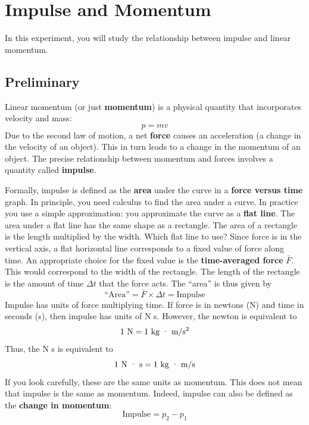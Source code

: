 \chapter{Impulse and Momentum}
%
In this experiment, you will study the relationship between impulse and linear momentum.
%
\section{Preliminary}
%
Linear momentum (or just \textbf{momentum}) is a physical quantity that incorporates velocity and mass:
\begin{equation}
    p = m v
\end{equation}
Due to the second law of motion, a net \textbf{force} causes an acceleration (a change in the velocity of an object). This in turn leads to a change in the momentum of an object. The precise relationship between momentum and forces involves a quantity called \textbf{impulse}.

Formally, impulse is defined as the \textbf{area} under the curve in a \textbf{force versus time} graph. In principle, you need calculus to find the area under a curve. In practice you use a simple approximation: you approximate the curve as a \textbf{flat line}. The area under a flat line has the same shape as a rectangle. The area of a rectangle is the length multiplied by the width. Which flat line to use? Since force is in the vertical axis, a flat horizontal line corresponds to a fixed value of force along time. An appropriate choice for the fixed value is the \textbf{time-averaged force} $\bar{F}$. This would correspond to the width of the rectangle. The length of the rectangle is the amount of time $\Delta t$ that the force acts. The ``area'' is thus given by
\begin{equation}
    \text{``Area''} = \bar{F} \times \Delta t = \text{Impulse}
\end{equation}
Impulse has units of force multiplying time. If force is in newtons (N) and time in seconds (s), then impulse has units of N s. However, the newton is equivalent to
\begin{equation}
    1 \ \text{N} = 1 \ \text{kg{ }\textperiodcentered{ }m/s\textsuperscript{2}}
\end{equation}
Thus, the N s is equivalent to
\begin{equation}
    1 \ \text{N{ }\textperiodcentered{ }s} = 1 \ \text{kg{ }\textperiodcentered{ }m/s}
\end{equation}
If you look carefully, these are the same units as momentum. This does not mean that impulse is the same as momentum. Indeed, impulse can also be defined as the \textbf{change in momentum}:
\begin{equation}
    \text{Impulse} = p_{2} - p_{1}
\end{equation}
%
